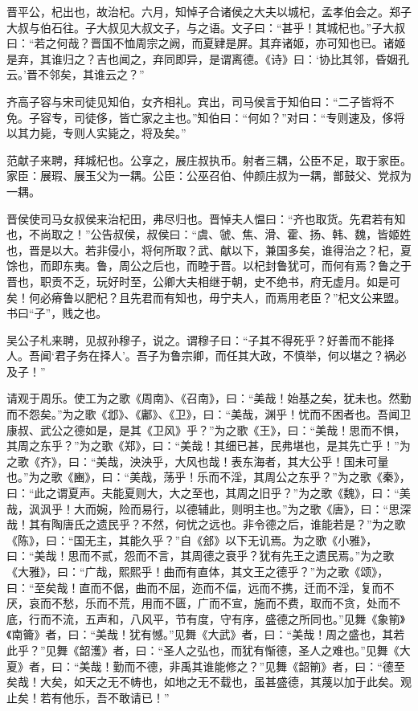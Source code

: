 \documentclass[a4paper,12pt,UTF8,twoside]{ctexbook}
\begin{document}
晋平公，杞出也，故治杞。六月，知悼子合诸侯之大夫以城杞，孟孝伯会之。郑子大叔与伯石往。子大叔见大叔文子，与之语。文子曰：“甚乎！其城杞也。”子大叔曰：“若之何哉？晋国不恤周宗之阙，而夏肄是屏。其弃诸姬，亦可知也已。诸姬是弃，其谁归之？吉也闻之，弃同即异，是谓离德。《诗》曰：‘协比其邻，昏姻孔云。’晋不邻矣，其谁云之？”

齐高子容与宋司徒见知伯，女齐相礼。宾出，司马侯言于知伯曰：“二子皆将不免。子容专，司徒侈，皆亡家之主也。”知伯曰：“何如？”对曰：“专则速及，侈将以其力毙，专则人实毙之，将及矣。”

范献子来聘，拜城杞也。公享之，展庄叔执币。射者三耦，公臣不足，取于家臣。家臣：展瑕、展玉父为一耦。公臣：公巫召伯、仲颜庄叔为一耦，鄫鼓父、党叔为一耦。

晋侯使司马女叔侯来治杞田，弗尽归也。晋悼夫人愠曰：“齐也取货。先君若有知也，不尚取之！”公告叔侯，叔侯曰：“虞、虢、焦、滑、霍、扬、韩、魏，皆姬姓也，晋是以大。若非侵小，将何所取？武、献以下，兼国多矣，谁得治之？杞，夏馀也，而即东夷。鲁，周公之后也，而睦于晋。以杞封鲁犹可，而何有焉？鲁之于晋也，职贡不乏，玩好时至，公卿大夫相继于朝，史不绝书，府无虚月。如是可矣！何必瘠鲁以肥杞？且先君而有知也，毋宁夫人，而焉用老臣？”杞文公来盟。书曰“子”，贱之也。

吴公子札来聘，见叔孙穆子，说之。谓穆子曰：“子其不得死乎？好善而不能择人。吾闻‘君子务在择人’。吾子为鲁宗卿，而任其大政，不慎举，何以堪之？祸必及子！”

请观于周乐。使工为之歌《周南》、《召南》，曰：“美哉！始基之矣，犹未也。然勤而不怨矣。”为之歌《邶》、《鄘》、《卫》，曰：“美哉，渊乎！忧而不困者也。吾闻卫康叔、武公之德如是，是其《卫风》乎？”为之歌《王》，曰：“美哉！思而不惧，其周之东乎？”为之歌《郑》，曰：“美哉！其细已甚，民弗堪也，是其先亡乎！”为之歌《齐》，曰：“美哉，泱泱乎，大风也哉！表东海者，其大公乎！国未可量也。”为之歌《豳》，曰：“美哉，荡乎！乐而不淫，其周公之东乎？”为之歌《秦》，曰：“此之谓夏声。夫能夏则大，大之至也，其周之旧乎？”为之歌《魏》，曰：“美哉，沨沨乎！大而婉，险而易行，以德辅此，则明主也。”为之歌《唐》，曰：“思深哉！其有陶唐氏之遗民乎？不然，何忧之远也。非令德之后，谁能若是？”为之歌《陈》，曰：“国无主，其能久乎？”自《郐》以下无讥焉。为之歌《小雅》，曰：“美哉！思而不贰，怨而不言，其周德之衰乎？犹有先王之遗民焉。”为之歌《大雅》，曰：“广哉，熙熙乎！曲而有直体，其文王之德乎？”为之歌《颂》，曰：“至矣哉！直而不倨，曲而不屈，迩而不偪，远而不携，迁而不淫，复而不厌，哀而不愁，乐而不荒，用而不匮，广而不宣，施而不费，取而不贪，处而不底，行而不流，五声和，八风平，节有度，守有序，盛德之所同也。”见舞《象箾》《南籥》者，曰：“美哉！犹有憾。”见舞《大武》者，曰：“美哉！周之盛也，其若此乎？”见舞《韶濩》者，曰：“圣人之弘也，而犹有惭德，圣人之难也。”见舞《大夏》者，曰：“美哉！勤而不德，非禹其谁能修之？”见舞《韶箾》者，曰：“德至矣哉！大矣，如天之无不帱也，如地之无不载也，虽甚盛德，其蔑以加于此矣。观止矣！若有他乐，吾不敢请已！”
\end{document}

